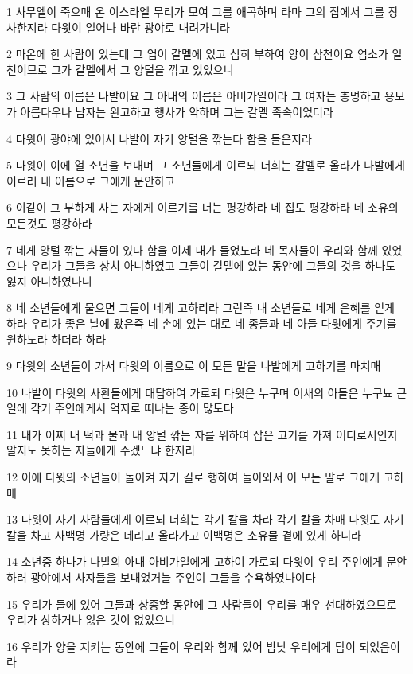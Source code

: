 \par 1 사무엘이 죽으매 온 이스라엘 무리가 모여 그를 애곡하며 라마 그의 집에서 그를 장사한지라 다윗이 일어나 바란 광야로 내려가니라
\par 2 마온에 한 사람이 있는데 그 업이 갈멜에 있고 심히 부하여 양이 삼천이요 염소가 일천이므로 그가 갈멜에서 그 양털을 깎고 있었으니
\par 3 그 사람의 이름은 나발이요 그 아내의 이름은 아비가일이라 그 여자는 총명하고 용모가 아름다우나 남자는 완고하고 행사가 악하며 그는 갈멜 족속이었더라
\par 4 다윗이 광야에 있어서 나발이 자기 양털을 깎는다 함을 들은지라
\par 5 다윗이 이에 열 소년을 보내며 그 소년들에게 이르되 너희는 갈멜로 올라가 나발에게 이르러 내 이름으로 그에게 문안하고
\par 6 이같이 그 부하게 사는 자에게 이르기를 너는 평강하라 네 집도 평강하라 네 소유의 모든것도 평강하라
\par 7 네게 앙털 깎는 자들이 있다 함을 이제 내가 들었노라 네 목자들이 우리와 함께 있었으나 우리가 그들을 상치 아니하였고 그들이 갈멜에 있는 동안에 그들의 것을 하나도 잃지 아니하였나니
\par 8 네 소년들에게 물으면 그들이 네게 고하리라 그런즉 내 소년들로 네게 은혜를 얻게 하라 우리가 좋은 날에 왔은즉 네 손에 있는 대로 네 종들과 네 아들 다윗에게 주기를 원하노라 하더라 하라
\par 9 다윗의 소년들이 가서 다윗의 이름으로 이 모든 말을 나발에게 고하기를 마치매
\par 10 나발이 다윗의 사환들에게 대답하여 가로되 다윗은 누구며 이새의 아들은 누구뇨 근일에 각기 주인에게서 억지로 떠나는 종이 많도다
\par 11 내가 어찌 내 떡과 물과 내 양털 깎는 자를 위하여 잡은 고기를 가져 어디로서인지 알지도 못하는 자들에게 주겠느냐 한지라
\par 12 이에 다윗의 소년들이 돌이켜 자기 길로 행하여 돌아와서 이 모든 말로 그에게 고하매
\par 13 다윗이 자기 사람들에게 이르되 너희는 각기 칼을 차라 각기 칼을 차매 다윗도 자기 칼을 차고 사백명 가량은 데리고 올라가고 이백명은 소유물 곁에 있게 하니라
\par 14 소년중 하나가 나발의 아내 아비가일에게 고하여 가로되 다윗이 우리 주인에게 문안하러 광야에서 사자들을 보내었거늘 주인이 그들을 수욕하였나이다
\par 15 우리가 들에 있어 그들과 상종할 동안에 그 사람들이 우리를 매우 선대하였으므로 우리가 상하거나 잃은 것이 없었으니
\par 16 우리가 양을 지키는 동안에 그들이 우리와 함께 있어 밤낮 우리에게 담이 되었음이라
